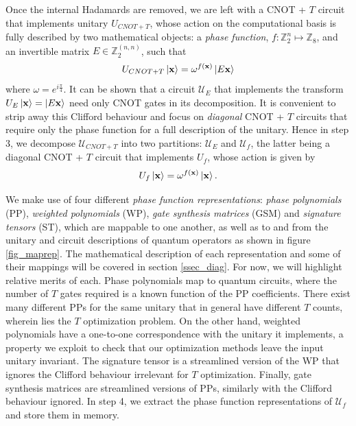 \documentclass[notitlepage]{article}
\theoremstyle{definition}
\theoremstyle{problem}
\theoremstyle{lemma}
\begin{document}
Once the internal Hadamards are removed, we are left with a CNOT + $T$ circuit 
that implements unitary $U_{CNOT+T}$, whose action on the computational basis is fully described by two mathematical objects: a \emph{phase function}, $f: \mathbb{Z}_2^n \mapsto \mathbb{Z}_8$, and an invertible matrix $E \in \mathbb{Z}_2^{(n,n)}$, such that
\begin{equation}
U_{CNOT+T}\left\vert{\mathbf{x}}\right\rangle = \omega^{f(\mathbf{x})}\left\vert{E\mathbf{x}}\right\rangle
\end{equation}
where $\omega = e^{i\frac{\pi}{4}}$. It can be shown that a circuit $\mathcal{U}_E$ that implements the transform $U_E\left\vert{\mathbf{x}}\right\rangle=\left\vert{E\mathbf{x}}\right\rangle$ need only CNOT gates in its decomposition. It is convenient to strip away this Clifford behaviour and focus on \emph{diagonal} CNOT + $T$ circuits that require only the phase function for a full description of the unitary.
Hence in step 3, we decompose $\mathcal{U}_{CNOT+T}$ into two partitions: $\mathcal{U}_E$ and $\mathcal{U}_f$, the latter being a diagonal CNOT + $T$ circuit that implements $U_f$, whose action is given by
\begin{equation}
\label{e_U_f_wo}
U_f\left\vert{\mathbf{x}}\right\rangle = \omega^{f(\mathbf{x})}\left\vert{\mathbf{x}}\right\rangle.
\end{equation}

We make use of four different \emph{phase function representations}: \emph{phase polynomials} (PP), \emph{weighted polynomials} (WP), \emph{gate synthesis matrices} (GSM) and \emph{signature tensors} (ST), which are mappable to one another, as well as to and from the unitary and circuit descriptions of quantum operators as shown in figure \ref{fig_maprep}. The mathematical description of each representation and some of their mappings will be covered in section \ref{ssec_diag}. For now, we will highlight relative merits of each.
Phase polynomials map to quantum circuits, where the number of $T$ gates required is a known function of the PP coefficients.
There exist many different PPs for the same unitary that in general have different $T$ counts, wherein lies the $T$ optimization problem. On the other hand, weighted polynomials have a one-to-one correspondence with the unitary it implements, a property we exploit to check that our optimization methods leave the input unitary invariant. The signature tensor is a streamlined version of the WP that ignores the Clifford behaviour irrelevant for $T$ optimization. Finally, gate synthesis matrices are streamlined versions of PPs, similarly with the Clifford behaviour ignored. In step 4, we extract the phase function representations of $\mathcal{U}_f$ and store them in memory.
\end{document}
